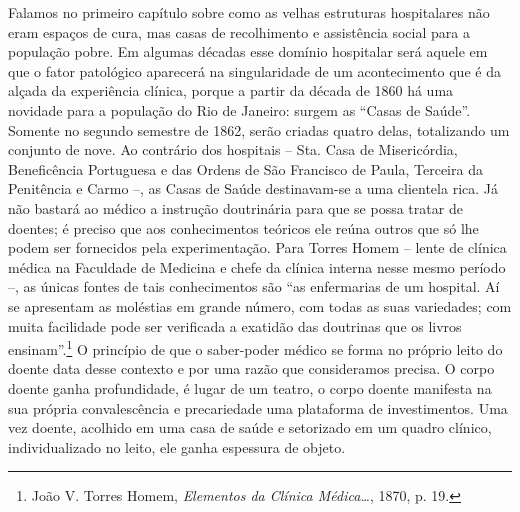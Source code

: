 Falamos no primeiro capítulo sobre como as velhas estruturas
hospitalares não eram espaços de cura, mas casas de recolhimento e
assistência social para a população pobre. Em algumas décadas esse
domínio hospitalar será aquele em que o fator patológico aparecerá na
singularidade de um acontecimento que é da alçada da experiência
clínica, porque a partir da década de 1860 há uma novidade para a
população do Rio de Janeiro: surgem as ``Casas de Saúde''. Somente no
segundo semestre de 1862, serão criadas quatro delas, totalizando um
conjunto de nove. Ao contrário dos hospitais -- Sta. Casa de
Misericórdia, Beneficência Portuguesa e das Ordens de São Francisco de
Paula, Terceira da Penitência e Carmo --, as Casas de Saúde
destinavam-se a uma clientela rica. Já não bastará ao médico a instrução
doutrinária para que se possa tratar de doentes; é preciso que aos
conhecimentos teóricos ele reúna outros que só lhe podem ser fornecidos
pela experimentação. Para Torres Homem -- lente de clínica médica na
Faculdade de Medicina e chefe da clínica interna nesse mesmo período --,
as únicas fontes de tais conhecimentos são ``as enfermarias de um
hospital. Aí se apresentam as moléstias em grande número, com todas as
suas variedades; com muita facilidade pode ser verificada a exatidão das
doutrinas que os livros ensinam''.\footnote{João V. Torres Homem,
  \emph{Elementos da Clínica Médica\ldots{}}, 1870, p. 19.} O princípio
de que o saber-poder médico se forma no próprio leito do doente data
desse contexto e por uma razão que consideramos precisa. O corpo doente
ganha profundidade, é lugar de um teatro, o corpo doente manifesta na
sua própria convalescência e precariedade uma plataforma de
investimentos. Uma vez doente, acolhido em uma casa de saúde e
setorizado em um quadro clínico, individualizado no leito, ele ganha
espessura de objeto.


